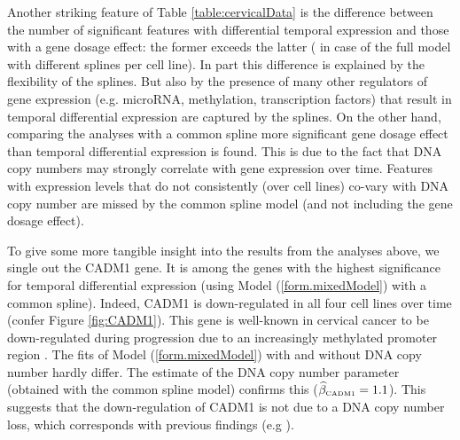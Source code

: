 Another striking feature of Table \ref{table:cervicalData} is the difference between the number of significant features with differential temporal expression and those with a gene dosage effect: the former exceeds the latter ( in case of the full model with different splines per cell line). In part this difference is explained by the flexibility of the splines. But also by the presence of many other regulators of gene expression (e.g. microRNA, methylation, transcription factors) that result in temporal differential expression are captured by the splines. On the other hand, comparing the analyses with a common spline more significant gene dosage effect than temporal differential expression is found. This is due to the fact that DNA copy numbers may strongly correlate with gene expression over time. Features with expression levels that do not consistently (over cell lines) co-vary with DNA copy number are missed by the common spline model (and not including the gene dosage effect).

To give some more tangible insight into the results from the analyses above, we single out the  CADM1 gene. It is among the genes with the highest significance for temporal differential expression (using Model (\ref{form.mixedModel}) with a common spline). Indeed, CADM1 is down-regulated in all four cell lines over time (confer Figure \ref{fig:CADM1}). This gene is well-known in cervical cancer to be down-regulated during progression due to an increasingly methylated promoter region \cite{Steenbergen2004, Overmeer2008}. The fits of Model (\ref{form.mixedModel}) with and without DNA copy number hardly differ. The estimate of the DNA copy number parameter (obtained with the common spline model) confirms this ($\hat{\beta}_{\mbox{{\tiny CADM1}}} = 1.1$). This suggests that the down-regulation of CADM1 is not due to a DNA copy number loss, which corresponds with previous findings (e.g \cite{Steenbergen2004}).

